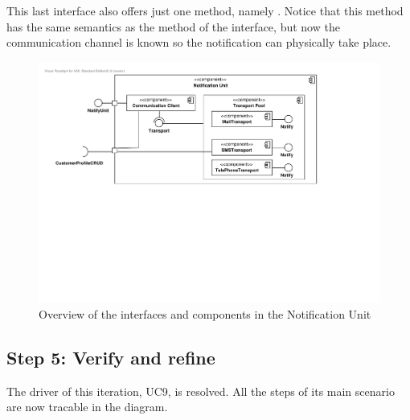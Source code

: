 \npar This last interface also offers just one method, namely
. Notice that this method has the same semantics as
the method of the  interface, but now the communication
channel is known so the notification can physically take place.

\begin{figure}[H]
	\begin{centering}
		\includegraphics[width=\textwidth]{figs/add-it7-interfaces.pdf}
		\caption{Overview of the interfaces and components in the Notification Unit}
		\label{fig:it7/interfaces}
	\end{centering}
\end{figure}

\subsection{Step 5: Verify and refine}
\label{add:it7/verification}

\npar The driver of this iteration, UC9, is resolved. All the steps of its main
scenario are now tracable in the diagram.
